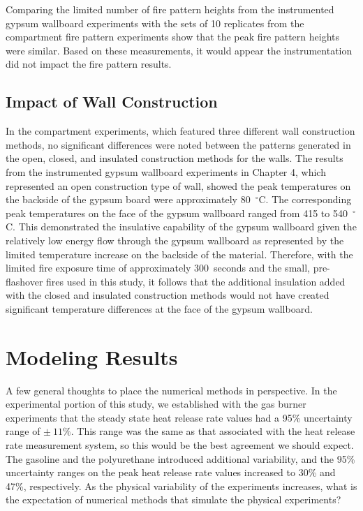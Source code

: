 \documentclass[twoside]{uocthesis}
\begin{document}
{Comparing the limited number of fire pattern heights from the instrumented gypsum wallboard experiments with the sets of 10 replicates from the compartment fire pattern experiments show that the peak fire pattern heights were similar.  Based on these measurements, it would appear the instrumentation did not impact the fire pattern results.

\subsection{Impact of Wall Construction}

In the compartment experiments, which featured three different wall construction methods, no significant differences were noted between the patterns generated in the open, closed, and insulated construction methods for the walls.  The results from the instrumented gypsum wallboard experiments in Chapter 4, which represented an open construction type of wall, showed the peak temperatures on the backside of the gypsum board were approximately 80~$^\circ$C.  The corresponding peak temperatures on the face of the gypsum wallboard ranged from 415 to 540~$^\circ$C.  This demonstrated the insulative capability of the gypsum wallboard given the relatively low energy flow through the gypsum wallboard as represented by the limited temperature increase on the backside of the material.  Therefore, with the limited fire exposure time of approximately 300~seconds and the small, pre-flashover fires used in this study, it follows that the additional insulation added with the closed and insulated construction methods would not have created significant temperature differences at the face of the gypsum wallboard.  

\section{Modeling Results}

A few general thoughts to place the numerical methods in perspective.  In the experimental portion of this study, we established with the gas burner experiments that the steady state heat release rate values had a 95\% uncertainty range of $\pm~11\%$.  This range was the same as that associated with the heat release rate measurement system, so this would be the best agreement we should expect.  The gasoline and the polyurethane introduced additional variability, and the 95\% uncertainty ranges on the peak heat release rate values increased to 30\% and 47\%, respectively.  As the physical variability of the experiments increases, what is the expectation of numerical methods that simulate the physical experiments? 

}
\end{document}
